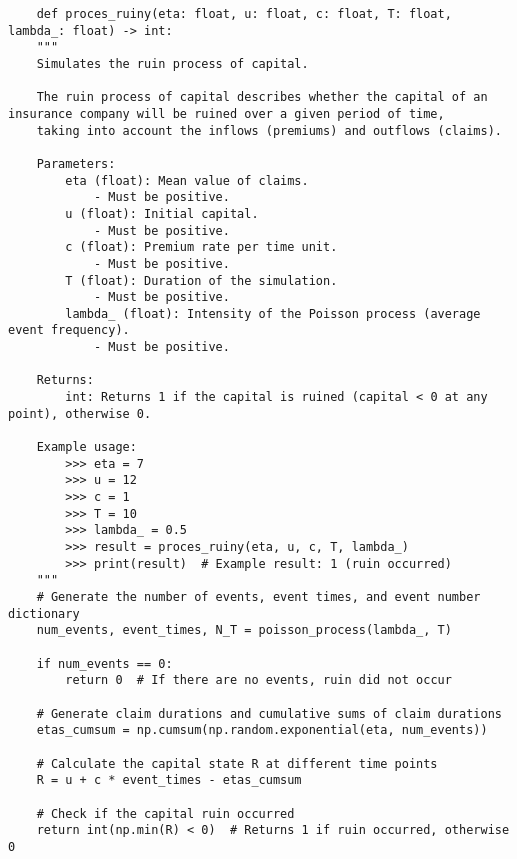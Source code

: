 \documentclass[12pt,letterpaper]{article}
\theoremstyle{definition}
\begin{document}
\begin{lstlisting}
    def proces_ruiny(eta: float, u: float, c: float, T: float, lambda_: float) -> int:
    """
    Simulates the ruin process of capital.

    The ruin process of capital describes whether the capital of an insurance company will be ruined over a given period of time,
    taking into account the inflows (premiums) and outflows (claims).

    Parameters:
        eta (float): Mean value of claims.
            - Must be positive.
        u (float): Initial capital.
            - Must be positive.
        c (float): Premium rate per time unit.
            - Must be positive.
        T (float): Duration of the simulation.
            - Must be positive.
        lambda_ (float): Intensity of the Poisson process (average event frequency).
            - Must be positive.

    Returns:
        int: Returns 1 if the capital is ruined (capital < 0 at any point), otherwise 0.

    Example usage:
        >>> eta = 7
        >>> u = 12
        >>> c = 1
        >>> T = 10
        >>> lambda_ = 0.5
        >>> result = proces_ruiny(eta, u, c, T, lambda_)
        >>> print(result)  # Example result: 1 (ruin occurred)
    """
    # Generate the number of events, event times, and event number dictionary
    num_events, event_times, N_T = poisson_process(lambda_, T)

    if num_events == 0:
        return 0  # If there are no events, ruin did not occur

    # Generate claim durations and cumulative sums of claim durations
    etas_cumsum = np.cumsum(np.random.exponential(eta, num_events))

    # Calculate the capital state R at different time points
    R = u + c * event_times - etas_cumsum

    # Check if the capital ruin occurred
    return int(np.min(R) < 0)  # Returns 1 if ruin occurred, otherwise 0

\end{lstlisting}
\end{document}
